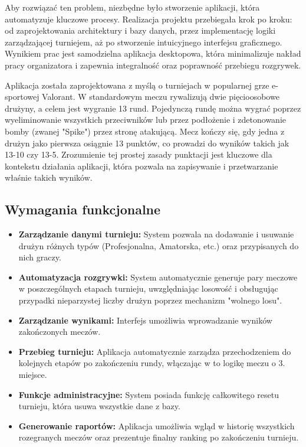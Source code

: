 \documentclass[12pt, a4paper]{article}
\begin{document}
Aby rozwiązać ten problem, niezbędne było stworzenie aplikacji, która automatyzuje kluczowe procesy. Realizacja projektu przebiegała krok po kroku: od zaprojektowania architektury i bazy danych, przez implementację logiki zarządzającej turniejem, aż po stworzenie intuicyjnego interfejsu graficznego. Wynikiem prac jest samodzielna aplikacja desktopowa, która minimalizuje nakład pracy organizatora i zapewnia integralność oraz poprawność przebiegu rozgrywek.

Aplikacja została zaprojektowana z myślą o turniejach w popularnej grze e-sportowej Valorant. W standardowym meczu rywalizują dwie pięcioosobowe drużyny, a celem jest wygranie 13 rund. Pojedynczą rundę można wygrać poprzez wyeliminowanie wszystkich przeciwników lub przez podłożenie i zdetonowanie bomby (zwanej "Spike") przez stronę atakującą. Mecz kończy się, gdy jedna z drużyn jako pierwsza osiągnie 13 punktów, co prowadzi do wyników takich jak 13-10 czy 13-5. Zrozumienie tej prostej zasady punktacji jest kluczowe dla kontekstu działania aplikacji, która pozwala na zapisywanie i przetwarzanie właśnie takich wyników.

\subsection{Wymagania funkcjonalne}
\begin{itemize}
    \item \textbf{Zarządzanie danymi turnieju:} System pozwala na dodawanie i usuwanie drużyn różnych typów (Profesjonalna, Amatorska, etc.) oraz przypisanych do nich graczy.
    \item \textbf{Automatyzacja rozgrywki:} System automatycznie generuje pary meczowe w poszczególnych etapach turnieju, uwzględniając losowość i obsługując przypadki nieparzystej liczby drużyn poprzez mechanizm "wolnego losu".
    \item \textbf{Zarządzanie wynikami:} Interfejs umożliwia wprowadzanie wyników zakończonych meczów.
    \item \textbf{Przebieg turnieju:} Aplikacja automatycznie zarządza przechodzeniem do kolejnych etapów po zakończeniu rundy, włączając w to logikę meczu o 3. miejsce.
    \item \textbf{Funkcje administracyjne:} System posiada funkcję całkowitego resetu turnieju, która usuwa wszystkie dane z bazy.
    \item \textbf{Generowanie raportów:} Aplikacja umożliwia wgląd w historię wszystkich rozegranych meczów oraz prezentuje finalny ranking po zakończeniu turnieju.
\end{itemize}
\end{document}
